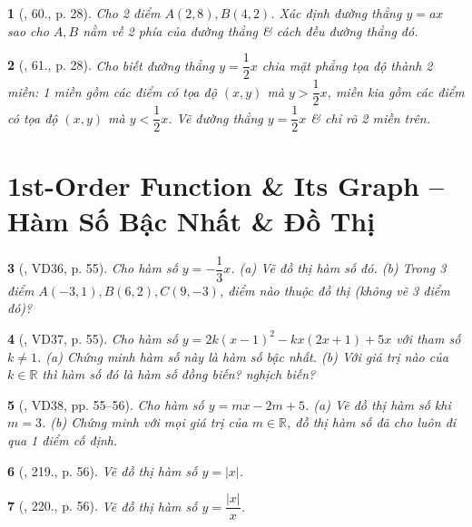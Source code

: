 \documentclass{article}
\newtheorem{baitoan}{}
\begin{document}
\begin{baitoan}[\cite{Binh_Toan_9_tap_1}, 60., p. 28]
	Cho 2 điểm $A(2,8),B(4,2)$. Xác định đường thẳng $y = ax$ sao cho $A,B$ nằm về 2 phía của đường thẳng \& cách đều đường thẳng đó.
\end{baitoan}

\begin{baitoan}[\cite{Binh_Toan_9_tap_1}, 61., p. 28]
	Cho biết đường thẳng $y = \dfrac{1}{2}x$ chia mặt phẳng tọa độ thành 2 miền: 1 miền gồm các điểm có tọa độ $(x,y)$ mà $y > \dfrac{1}{2}x$, miền kia gồm các điểm có tọa độ $(x,y)$ mà $y < \dfrac{1}{2}x$. Vẽ đường thẳng $y = \dfrac{1}{2}x$ \& chỉ rõ 2 miền trên.
\end{baitoan}


\section{1st-Order Function \& Its Graph -- Hàm Số Bậc Nhất \& Đồ Thị}

\begin{baitoan}[\cite{Tuyen_Toan_8}, VD36, p. 55]
	Cho hàm số $y = -\dfrac{1}{3}x$. (a) Vẽ đồ thị hàm số đó. (b) Trong 3 điểm $A(-3,1),B(6,2),C(9,-3)$, điểm nào thuộc đồ thị (không vẽ 3 điểm đó)?
\end{baitoan}

\begin{baitoan}[\cite{Tuyen_Toan_8}, VD37, p. 55]
	Cho hàm số $y = 2k(x - 1)^2 - kx(2x + 1) + 5x$ với tham số $k\ne1$. (a) Chứng minh hàm số này là hàm số bậc nhất. (b) Với giá trị nào của $k\in\mathbb{R}$ thì hàm số đó là hàm số đồng biến? nghịch biến?
\end{baitoan}

\begin{baitoan}[\cite{Tuyen_Toan_8}, VD38, pp. 55--56]
	Cho hàm số $y = mx - 2m + 5$. (a) Vẽ đồ thị hàm số khi $m = 3$. (b) Chứng minh với mọi giá trị của $m\in\mathbb{R}$, đồ thị hàm số đã cho luôn đi qua 1 điểm cố định.
\end{baitoan}

\begin{baitoan}[\cite{Tuyen_Toan_8}, 219., p. 56]
	Vẽ đồ thị hàm số $y = |x|$.
\end{baitoan}

\begin{baitoan}[\cite{Tuyen_Toan_8}, 220., p. 56]
	Vẽ đồ thị hàm số $y = \dfrac{|x|}{x}$.
\end{baitoan}
\end{document}
